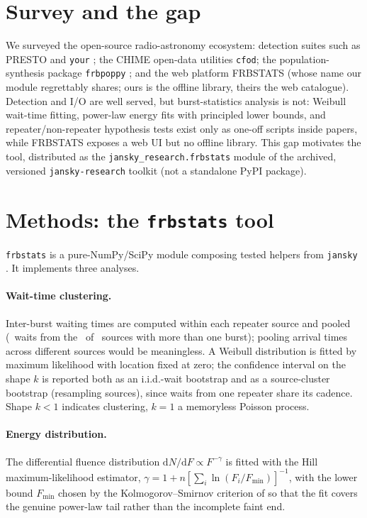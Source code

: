\documentclass[twocolumn]{aastex631}
\newcommand{\code}[1]{\texttt{#1}}
\begin{document}
\section{Survey and the gap}
We surveyed the open-source radio-astronomy ecosystem: detection suites such as PRESTO
\citep{presto} and \code{your} \citep{your2020}; the CHIME open-data utilities
\code{cfod}; the population-synthesis package \code{frbpoppy} \citep{frbpoppy2019}; and
the web platform FRBSTATS \citep{frbstatsplatform} (whose name our module regrettably
shares; ours is the offline library, theirs the web catalogue). Detection and I/O are well
served, but burst-statistics analysis is not: Weibull wait-time fitting, power-law energy
fits with principled lower bounds, and repeater/non-repeater hypothesis tests exist only
as one-off scripts inside papers, while FRBSTATS exposes a web UI but no offline library.
This gap motivates the tool, distributed as the \code{jansky\_research.frbstats} module
of the archived, versioned \code{jansky-research} toolkit (not a standalone PyPI
package).

\section{Methods: the \code{frbstats} tool}
\code{frbstats} is a pure-NumPy/SciPy module composing tested helpers from \code{jansky}
\citep{jansky}. It implements three analyses.

\paragraph{Wait-time clustering.} Inter-burst waiting times are computed within each
repeater source and pooled (\weibullNwaits\ waits from the \nWaitSources\ of
\nRepeaterSources\ sources with more than one burst); pooling arrival times across
different sources would be meaningless. A Weibull distribution is fitted by maximum
likelihood with location fixed at zero; the confidence interval on the shape $k$ is
reported both as an i.i.d.-wait bootstrap and as a source-cluster bootstrap (resampling
sources), since waits from one repeater share its cadence. Shape $k<1$ indicates
clustering, $k=1$ a memoryless Poisson process.

\paragraph{Energy distribution.} The differential fluence distribution
$\mathrm{d}N/\mathrm{d}F\propto F^{-\gamma}$ is fitted with the Hill maximum-likelihood
estimator, $\gamma = 1 + n\left[\sum_i \ln(F_i/F_\mathrm{min})\right]^{-1}$, with the
lower bound $F_\mathrm{min}$ chosen by the Kolmogorov--Smirnov criterion of
\citet{clauset2009} so that the fit covers the genuine power-law tail rather than the
incomplete faint end.
\end{document}

